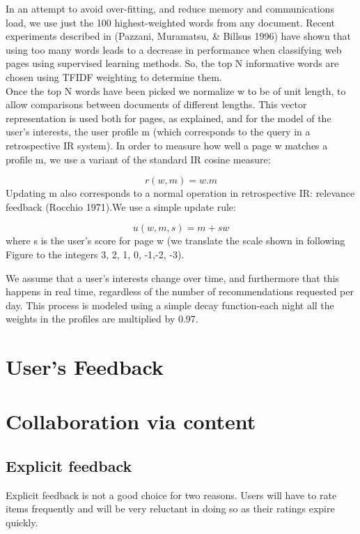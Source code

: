 In an attempt to avoid over-fitting, and reduce memory and communications load, we use just the 100 highest-weighted words from any document. Recent experiments described in (Pazzani, Muramatsu, \& Billsus 1996) have shown that using too many words leads to a decrease in performance when classifying web pages using supervised learning methods. So, the top N informative words are chosen using TFIDF weighting to determine them.\\
Once the top N words have been picked we normalize w to be of unit length, to allow comparisons between documents of different lengths.
This vector representation is used both for pages, as explained, and for the model of the user's interests, the user profile m (which corresponds to the query in a retrospective IR system). In order to measure how well a page w matches a profile m, we use a variant of the standard IR cosine measure:

\begin{equation}\label{eq:13}
r(w,m)= w.m
\end{equation}
Updating m also corresponds to a normal operation in retrospective IR: relevance feedback (Rocchio 1971).We use a simple update rule:


\begin{equation}\label{eq:13}
u(w,m,s) =m+sw
\end{equation}
where s is the user's score for page w (we translate the scale shown in following Figure to the integers 3, 2, 1, 0, -1,-2, -3).

We assume that a user's interests change over time, and furthermore that this happens in real time, regardless of the number of recommendations requested per day. This process is modeled using a simple decay function-each night all the weights in the profiles are multiplied by 0.97.
 
\section{User's Feedback}

\section{Collaboration via content}
\subsection{Explicit feedback}
Explicit feedback is not a good choice for two reasons. Users will have to rate items frequently and will be very reluctant in doing so as their ratings expire quickly.


